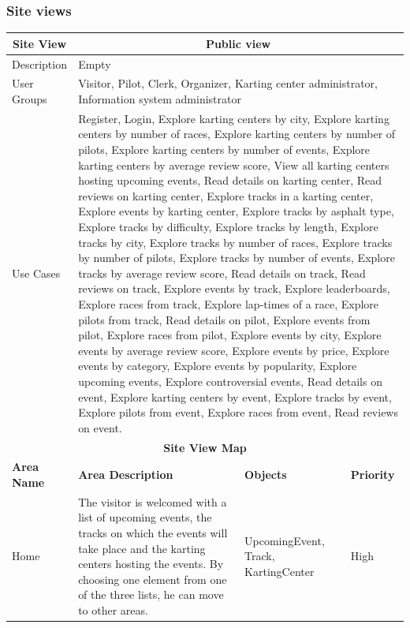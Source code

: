 \documentclass{beamer}
\begin{document}
\begin{frame}
    \frametitle{Site views}
    \begin{table}
        \centering
        \tiny
        \setlength{\tabcolsep}{1pt}
        \begin{tabular}{|m{2cm}|m{4cm}|m{3cm}|m{1cm}|}
        \hline
        \multicolumn{1}{|c|}{\textbf{Site View}} & \multicolumn{3}{c|}{\textbf{Public view}} \\ 
        \hline
        Description & \multicolumn{3}{m{8cm}|}{Empty} \\
        \hline
        User Groups & \multicolumn{3}{m{8cm}|}{Visitor, Pilot, Clerk, Organizer, 
        Karting center administrator, Information system administrator} \\
        \hline
        Use Cases & \multicolumn{3}{m{8cm}|}{Register, Login, Explore karting centers by city, 
        Explore karting centers by number of races, Explore karting centers by number of pilots, 
        Explore karting centers by number of events, Explore karting centers by average review score, 
        View all karting centers hosting upcoming events, Read details on karting center, 
        Read reviews on karting center, Explore tracks in a karting center, Explore events by karting center, 
        Explore tracks by asphalt type, Explore tracks by difficulty, Explore tracks by length, 
        Explore tracks by city, Explore tracks by number of races, Explore tracks by number of pilots, 
        Explore tracks by number of events, Explore tracks by average review score, Read details on track, 
        Read reviews on track, Explore events by track, Explore leaderboards, Explore races from track, 
        Explore lap-times of a race, Explore pilots from track, Read details on pilot, Explore events from pilot, 
        Explore races from pilot, Explore events by city, Explore events by average review score, 
        Explore events by price, Explore events by category, Explore events by popularity, 
        Explore upcoming events, Explore controversial events, Read details on event, 
        Explore karting centers by event, Explore tracks by event, Explore pilots from event, 
        Explore races from event, Read reviews on event.
        } \\
        \hline
        \multicolumn{4}{|c|}{\textbf{Site View Map}} \\
        \hline
        \textbf{Area Name} & \textbf{Area Description} & \textbf{Objects} & \textbf{Priority} \\
        \hline
        Home & The visitor is welcomed with a list of upcoming events,
        the tracks on which the events will take place and the karting centers hosting the events.
        By choosing one element from one of the three lists, he can move to other areas.
        & UpcomingEvent, Track, KartingCenter & High \\
        \hline
        \end{tabular}
    \end{table}
\end{frame}
\end{document}
